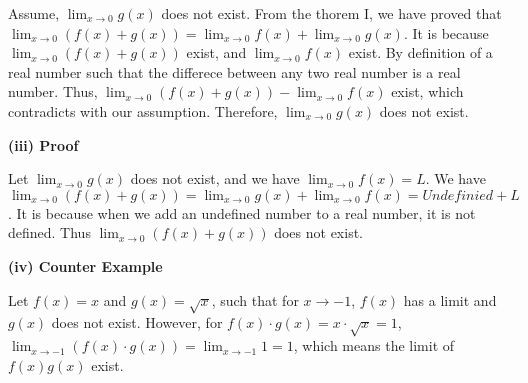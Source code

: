 \documentclass[a4paper,12pt]{report}
\begin{document}
\noindent
Assume, $\displaystyle{\lim_{x\to 0}}g(x)$ does not exist. From the thorem I, we have proved that $\displaystyle{\lim_{x\to 0}}(f(x)+g(x))=\displaystyle{\lim_{x\to 0}}f(x)+\displaystyle{\lim_{x\to 0}}g(x)$. It is because $\displaystyle{\lim_{x\to 0}}(f(x)+g(x))$ exist, and $\displaystyle{\lim_{x\to 0}}f(x)$ exist. By definition of a real number such that the differece between any two real number is a real number. Thus, $\displaystyle{\lim_{x\to 0}}(f(x)+g(x))-\displaystyle{\lim_{x\to 0}}f(x)$ exist, which contradicts with our assumption. Therefore, $\displaystyle{\lim_{x\to 0}}g(x)$ does not exist.

\noindent
\textbf{(iii) Proof}

\noindent
Let $\displaystyle{\lim_{x\to 0}}g(x)$ does not exist, and we have $\displaystyle{\lim_{x\to 0}}f(x)=L$. We have $\displaystyle{\lim_{x\to 0}}(f(x)+g(x)) = \displaystyle{\lim_{x\to 0}}g(x) + \displaystyle{\lim_{x\to 0}}f(x)=Undefinied + L$. It is because when we add an undefined number to a real number, it is not defined. Thus $\displaystyle{\lim_{x\to 0}}(f(x)+g(x))$ does not exist.

\noindent
\textbf{(iv) Counter Example}

\noindent
Let $f(x)=x$ and $g(x)=\sqrt{x}$, such that for $x\to -1$, $f(x)$ has a limit and $g(x)$ does not exist. However, for $f(x)\cdot{g(x)}=x\cdot{\sqrt{x}}=1$, $\displaystyle{\lim_{x\to -1}}(f(x)\cdot{g(x)})=\displaystyle{\lim_{x\to -1}}1=1$, which means the limit of $f(x)g(x)$ exist.
\end{document}
